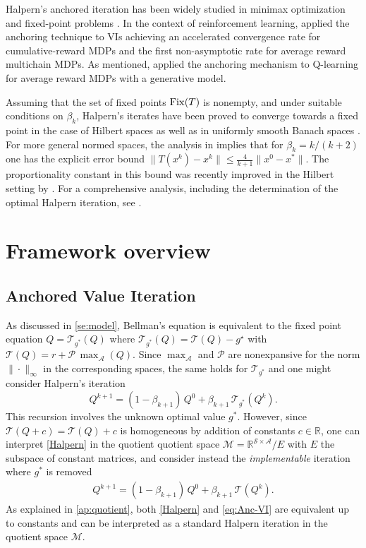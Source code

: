 \documentclass{article}
\newcommand{\cA}{\mathcal{A}}
\newcommand{\cS}{\mathcal{S}}
\newcommand{\cP}{\mathcal{P} }
\newcommand{\T}{\mathcal{T}}
\newcommand{\reals}{\mathbb{R}}
\newcommand{\maxA}{\mbox{$\max_\cA$}}
\newcommand{\X}{\mathcal{M}}
\newcommand{\Fix}{\mathop{\rm Fix}}
\newcommand{\R}{r}
\theoremstyle{plain}
\theoremstyle{definition}
\theoremstyle{remark}
\begin{document}
Halpern's anchored iteration has been widely studied in minimax optimization and fixed-point problems \citep{halpern1967fixed,sabach2017first, Lieder2021halpern, park2022exact, contreras2022optimal, yoon2021accelerated,cai2022stochastic}. In the context of reinforcement learning, \citet{lee2024accelerating, lee2025multi} applied the anchoring technique to VIs achieving an accelerated convergence rate for cumulative-reward MDPs and the first non-asymptotic rate for average reward multichain MDPs. As mentioned, \citet{bravostochastic} applied the anchoring mechanism to Q-learning for average reward MDPs with a generative model. 


Assuming that the set of fixed points $\Fix(T)$ is nonempty, and under suitable conditions on $\beta_k$, Halpern's iterates have been proved to converge towards a fixed point in the case of Hilbert spaces \citep{wittmann1992approximation} as well as in uniformly smooth Banach spaces \citep{reich1980strong, xu2002iterative}. 
For more general normed spaces, the analysis in \citet[Lemma 5]{sabach2017first} implies that for $\beta_k=k/(k+2)$ one has the 
explicit error bound $\|T(x^k)-x^k\|\leq \frac{4}{k+1}\|x^0-x^*\|$.
The proportionality constant in this bound was recently improved in the Hilbert setting by \citet{Lieder2021halpern, kim2021accelerated}. For a comprehensive analysis, including the determination of the optimal Halpern iteration, see \citet{ contreras2022optimal}.



\section{Framework overview}
\subsection{Anchored Value Iteration}
As discussed in \cref{se:model}, Bellman's equation is equivalent to the fixed point equation
$Q=\T_{g^*}(Q)$
where $\T_{g^*}(Q)=\T(Q)-g^{\star}$ with $\T(Q)=\R+\cP\,\maxA(Q)$. Since $\maxA$ and $\cP$ are nonexpansive for the norm $\big\|\cdot\big\|_\infty$ in the corresponding spaces, the same holds for $\T_{g^*}$ and one might consider Halpern's iteration 
\begin{equation}\label{Halpern}
Q^{k+1}=(1-\beta_{k+1})\, Q^0+ \beta_{k+1}\, \T_{g^*}(Q^{k}).
\end{equation}
This recursion involves the unknown optimal value $g^*$. However, since $\T(Q+c)=\T(Q)+c$ is homogeneous by addition of constants $c\in\reals$,
one can interpret \eqref{Halpern} in the quotient 
quotient space $\X=\reals^{\cS\times\cA}/E$ with $E$ the subspace of constant matrices, and consider instead the \emph{implementable} iteration
where $g^*$ is removed
\begin{align}
    Q^{k+1}  =(1-\beta_{k+1})\, Q^0 +\beta_{k+1}\,\T(Q^{k}). \tag{Anc-VI}
    \label{eq:Anc-VI}
\end{align}
 As explained in \cref{ap:quotient}, both \eqref{Halpern} and \eqref{eq:Anc-VI}
are equivalent up to constants and can be interpreted as a standard Halpern iteration in the quotient space $\X$.
\end{document}
